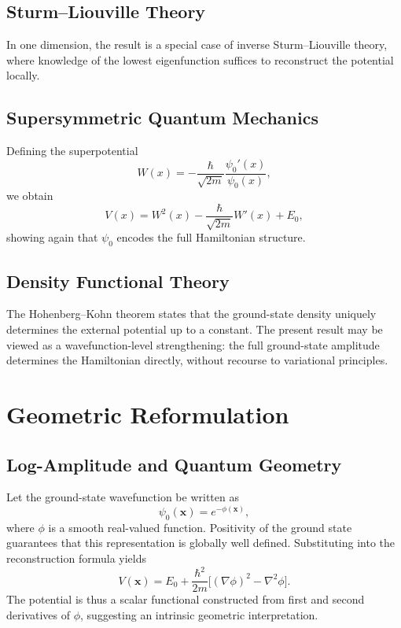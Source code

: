 \documentclass[11pt]{article}
\begin{document}
\subsection{Sturm--Liouville Theory}
In one dimension, the result is a special case of inverse Sturm--Liouville theory, where knowledge of the lowest eigenfunction suffices to reconstruct the potential locally.

\subsection{Supersymmetric Quantum Mechanics}
Defining the superpotential
\begin{equation}
W(x) = -\frac{\hbar}{\sqrt{2m}}\frac{\psi_0'(x)}{\psi_0(x)},
\end{equation}
we obtain
\begin{equation}
V(x) = W^2(x) - \frac{\hbar}{\sqrt{2m}}W'(x) + E_0,
\end{equation}
showing again that $\psi_0$ encodes the full Hamiltonian structure.

\subsection{Density Functional Theory}
The Hohenberg--Kohn theorem states that the ground-state density uniquely determines the external potential up to a constant. The present result may be viewed as a wavefunction-level strengthening: the full ground-state amplitude determines the Hamiltonian directly, without recourse to variational principles.

\section{Geometric Reformulation}

\subsection{Log-Amplitude and Quantum Geometry}
Let the ground-state wavefunction be written as
\begin{equation}
\psi_0(\mathbf{x}) = e^{-\phi(\mathbf{x})},
\end{equation}
where $\phi$ is a smooth real-valued function. Positivity of the ground state guarantees that this representation is globally well defined. Substituting into the reconstruction formula yields
\begin{equation}
V(\mathbf{x}) = E_0 + \frac{\hbar^2}{2m}\Big[(\nabla \phi)^2 - \nabla^2 \phi\Big].
\end{equation}
The potential is thus a scalar functional constructed from first and second derivatives of $\phi$, suggesting an intrinsic geometric interpretation.
\end{document}
